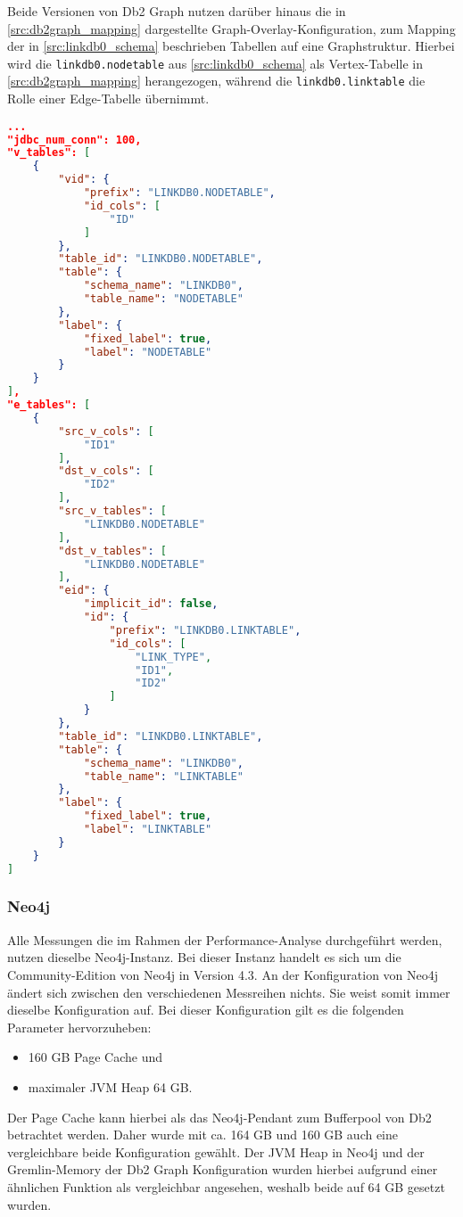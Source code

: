 Beide Versionen von Db2 Graph nutzen darüber hinaus die in \autoref{src:db2graph_mapping} dargestellte Graph-Overlay-Konfiguration, zum Mapping der in \autoref{src:linkdb0_schema} beschrieben Tabellen auf eine Graphstruktur. Hierbei wird die \texttt{linkdb0.nodetable} aus \autoref{src:linkdb0_schema} als Vertex-Tabelle in \autoref{src:db2graph_mapping} herangezogen, während die \texttt{linkdb0.linktable} die Rolle einer Edge-Tabelle übernimmt. 
\begin{lstlisting}[label=src:db2graph_mapping,caption={Graph-Overlay-Konfiguration Db2 Graph},language=json]
...
"jdbc_num_conn": 100,
"v_tables": [
    {
        "vid": {
            "prefix": "LINKDB0.NODETABLE",
            "id_cols": [
                "ID"
            ]
        },
        "table_id": "LINKDB0.NODETABLE",
        "table": {
            "schema_name": "LINKDB0",
            "table_name": "NODETABLE"
        },
        "label": {
            "fixed_label": true,
            "label": "NODETABLE"
        }
    }
],
"e_tables": [
    {
        "src_v_cols": [
            "ID1"
        ],
        "dst_v_cols": [
            "ID2"
        ],
        "src_v_tables": [
            "LINKDB0.NODETABLE"
        ],
        "dst_v_tables": [
            "LINKDB0.NODETABLE"
        ],
        "eid": {
            "implicit_id": false,
            "id": {
                "prefix": "LINKDB0.LINKTABLE",
                "id_cols": [
                    "LINK_TYPE",
                    "ID1",
                    "ID2"
                ]
            }
        },
        "table_id": "LINKDB0.LINKTABLE",
        "table": {
            "schema_name": "LINKDB0",
            "table_name": "LINKTABLE"
        },
        "label": {
            "fixed_label": true,
            "label": "LINKTABLE"
        }
    }
]
\end{lstlisting}

\subsubsection{Neo4j}
Alle Messungen die im Rahmen der Performance-Analyse durchgeführt werden, nutzen dieselbe Neo4j-Instanz. Bei dieser Instanz handelt es sich um die Community-Edition von Neo4j in Version 4.3. An der Konfiguration von Neo4j ändert sich zwischen den verschiedenen Messreihen nichts. Sie weist somit immer dieselbe Konfiguration auf. Bei dieser Konfiguration gilt es die folgenden Parameter hervorzuheben: 
\begin{itemize}
    \item 160 GB Page Cache und
    \item maximaler JVM Heap 64 GB.
\end{itemize}
Der Page Cache kann hierbei als das Neo4j-Pendant zum Bufferpool von Db2 betrachtet werden. Daher wurde mit ca. 164 GB und 160 GB auch eine vergleichbare beide Konfiguration gewählt. Der JVM Heap in Neo4j und der Gremlin-Memory der Db2 Graph Konfiguration wurden hierbei aufgrund einer ähnlichen Funktion als vergleichbar angesehen, weshalb beide auf 64 GB gesetzt wurden.

